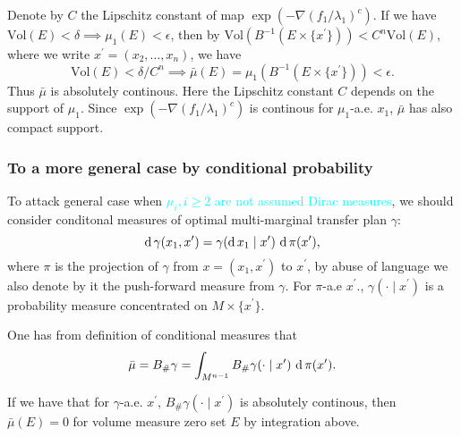 Denote by $C$ the Lipschitz constant of map \(\exp(-\nabla(f_1/\lambda_1)^c)\).
If we have $ \text{Vol}(E) < \delta \implies \mu_1(E) < \epsilon$,
then by $\text{Vol}(B^{-1}( E\times \{x^\prime\})) < C^n \text{Vol}(E)$,
where we write $x^\prime = (x_2, \ldots, x_n)$,
we have 
\[\text{Vol}(E) < \delta / C^n \implies \bar{\mu}(E)=\mu_1(B^{-1}(E \times \{x^\prime\})) < \epsilon.
\]
Thus $\bar{\mu}$ is absolutely continous.
Here the Lipschitz constant $C$ depends on the support of $\mu_1$.
Since $\exp(-\nabla(f_1 / \lambda_1)^c)$ is continous for $\mu_1$-a.e. $x_1$,
$\bar{\mu}$ has also compact support.


\subsubsection{To a more general case by conditional probability}
To attack general case when \textcolor{cyan}{$\mu_i, i \geq 2$ are not assumed Dirac measures},
we should consider conditonal measures of optimal multi-marginal transfer plan $\gamma$:
\[
	\operatorname{d} \gamma(x_1, x^\prime)= \gamma(\operatorname{d} x_1 \mid x^\prime)\, \operatorname{d} \pi(x^\prime) ,
\]
where $\pi$ is the projection of $\gamma$ from $x = (x_1, x^\prime)$ to $x^\prime$,
by abuse of language we also denote by it the push-forward measure from $\gamma$.
For $\pi$-a.e $x^\prime$., $\gamma(\cdot \mid x^\prime)$ is a probability measure
concentrated on $M \times \{x^\prime\}$.

One has from definition of conditional measures that
\[
	\bar{\mu} = B_{\#} \gamma = \int_{M^{n-1}} B_{\#} \gamma(\cdot \mid x^\prime)\, \operatorname{d} \pi(x^\prime).
\]


If we have that for $\gamma$-a.e. $x^\prime$,
$B_{\#} \gamma(\cdot \mid x^\prime)$
is absolutely continous,
then $\bar{\mu}(E)=0$ for volume measure zero set $E$ by integration above.


